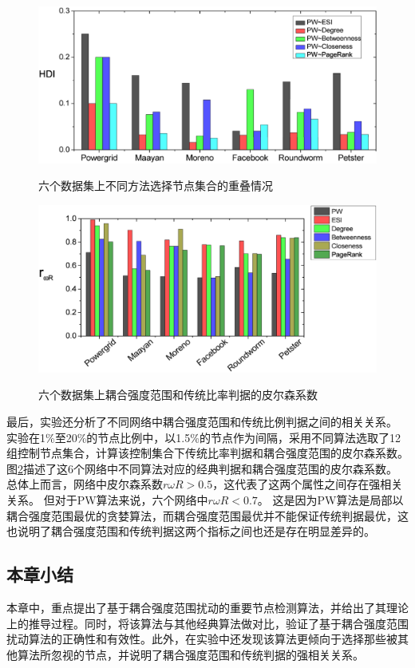 \begin{figure}[ht]%
	\centering
	\includegraphics[width=0.9\columnwidth]{chapter4Fig/hdi.eps}\\
	\caption{六个数据集上不同方法选择节点集合的重叠情况}
	\label{Fig: hdi}	
	
\end{figure}
\begin{figure}[ht]%
	\centering
	\includegraphics[width=0.9\columnwidth]{chapter4Fig/pearson.eps}\\
	\caption{六个数据集上耦合强度范围和传统比率判据的皮尔森系数}
	\label{Fig: pearson}	
	
\end{figure}

最后，实验还分析了不同网络中耦合强度范围和传统比例判据之间的相关关系。
实验在1\%至20\%的节点比例中，以1.5\%的节点作为间隔，采用不同算法选取了12组控制节点集合，计算该控制集合下传统比率判据和耦合强度范围的皮尔森系数。
图\ref{Fig: pearson}描述了这6个网络中不同算法对应的经典判据和耦合强度范围的皮尔森系数。
总体上而言，网络中皮尔森系数$ r{\omega R}>0.5 $，这代表了这两个属性之间存在强相关关系。
但对于PW算法来说，六个网络中$ r{\omega R}<0.7 $。
这是因为PW算法是局部以耦合强度范围最优的贪婪算法，而耦合强度范围最优并不能保证传统判据最优，这也说明了耦合强度范围和传统判据这两个指标之间也还是存在明显差异的。


\subsection{本章小结}
本章中，重点提出了基于耦合强度范围扰动的重要节点检测算法，并给出了其理论上的推导过程。同时，将该算法与其他经典算法做对比，验证了基于耦合强度范围扰动算法的正确性和有效性。此外，在实验中还发现该算法更倾向于选择那些被其他算法所忽视的节点，并说明了耦合强度范围和传统判据的强相关关系。

\clearpage
